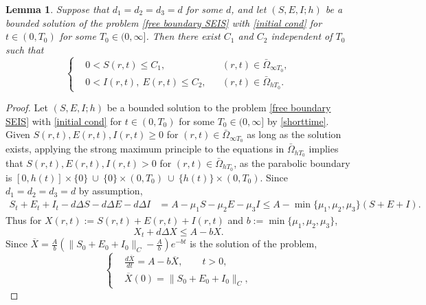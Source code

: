\documentclass[11pt]{amsart}
\numberwithin{equation}{section}
\theoremstyle{plain}
\newtheorem{lemma}[theorem]{Lemma}
\theoremstyle{definition}
\begin{document}
	\begin{lemma} \label{uniform SEI}
		Suppose that $d_1=d_2=d_3=d$ for some $d$, and let $(S,E,I;h)$ be a bounded solution of the problem  \cref{free boundary SEIS} with \cref{initial cond} for $t \in (0,T_0)$ for some $T_0 \in (0,\infty]$. Then there exist $C_1$ and $C_2$ independent of $T_0$ such that
	\begin{equation*}
		\left \{ \begin{aligned}
				&0<S(r,t)\leq C_1, \qquad &&(r,t) \in \bar\Omega_{\infty T_0},\\
				&0<I(r,t),\ E(r,t)\leq C_2, &&(r,t) \in \bar\Omega_{h T_0}.
			\end{aligned} \right.
	\end{equation*}
	\end{lemma}
	
	\begin{proof}
		Let $(S,E,I;h)$ be a bounded solution to the problem \cref{free boundary SEIS} with \cref{initial cond} for $t\in(0,T_0)$ for some $T_0\in(0,\infty]$ by \cref{shorttime}.
		Given $S(r,t), E(r,t), I(r,t) \geq 0$ for $(r,t) \in \bar\Omega_{\infty T_0}$ as long as the solution exists, applying the strong maximum principle to the equations in $\bar \Omega _{h T_0}$ implies that $S(r,t), E(r,t), I(r,t) >0$ for $(r,t)\in \bar \Omega_{h T_0}$, as the parabolic boundary is $[0,h(t)] \times \{ 0\}\  \cup \ \{ 0 \} \times (0,T_0) \ \cup \ \{h(t)\} \times (0,T_0)$.
		Since $d_1=d_2=d_3=d$ by assumption, 
		\begin{equation*}
		\begin{aligned}
			S_t+E_t+I_t-d\Delta S-d\Delta E-d\Delta I&=A-\mu_1 S-\mu_2 E-\mu_3 I\leq A-\min\{\mu_1, \mu_2, \mu_3 \}(S+E+I).
		\end{aligned}
		\end{equation*}
		Thus for $X(r,t):=S(r,t)+E(r,t)+I(r,t)$ and $b:=\min\{\mu_1, \mu_2, \mu_3 \}$,
		\begin{equation*}
			X_t+d\Delta X \leq A-bX.
		\end{equation*}
		Since $\overline X=\frac{A}{b}(\lVert S_0+E_0+I_0\rVert_C-\frac{A}{b})e^{-bt}$ is the solution of the problem,
		\begin{equation*}
			\left \{ \begin{aligned}
				&\frac{d\overline{X}}{dt}=A-b\overline{X},\qquad t>0,\\
				&\overline{X}(0)=\lVert S_0+E_0+I_0\rVert_C,
			\end{aligned} \right.
		\end{equation*}

\end{proof}
\end{document}
